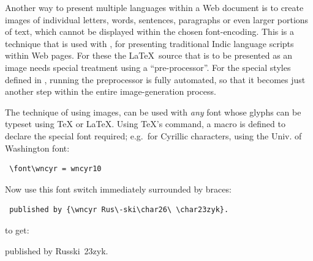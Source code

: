 Another way to present multiple languages within a Web document is to
create images of individual letters, words, sentences, paragraphs
or even larger portions of text, which cannot be displayed within
the chosen font-encoding.
This is a technique that is used with \IndicHTML, for presenting
traditional Indic language scripts within Web pages.
For these the \LaTeX\ source that is to be presented as an image
needs special treatment using a ``pre-processor''. 
For the special styles defined in \IndicHTML, running the preprocessor
is fully automated, so that it becomes just another step 
within the entire image-generation process.

\medskip

The technique of using images, can be used with \emph{any} font 
whose glyphs can be typeset using \TeX{} or \LaTeX. 
Using \TeX's  command, a macro is defined to declare
the special font required; 
e.g.\ for Cyrillic characters, using the Univ. of Washington font:
\begin{small}
\begin{verbatim}
 \font\wncyr = wncyr10
\end{verbatim}
\end{small}

\noindent
Now use this font switch immediately surrounded by braces:
\begin{small}
\begin{verbatim}
 published by {\wncyr Rus\-ski\char26\ \char23zyk}.
\end{verbatim}
\end{small}
to get:
\begin{center}
 published by {\wncyr Rus\-ski\ \char23zyk}.
\end{center}


